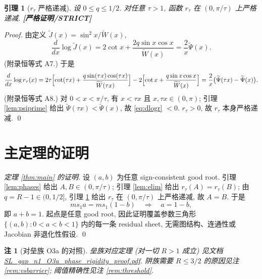 \documentclass[UTF8]{ctexart}
\newtheorem{lemma}[theorem]{引理}
\newtheorem{remark}[theorem]{注}
\newcommand{\STRICT}{\textbf{[严格证明/STRICT]}}
\begin{document}
\begin{lemma}[$r_{\tau}$ 严格递减]\label{lem:rtau}
	设 $0\le q\le1/2$. 对任意 $\tau>1$, 函数 $r_{\tau}$ 在 $(0,\pi/\tau)$ 上严格递减.
	\STRICT{}
\end{lemma}

\begin{proof}
	由定义 $\widetilde J(x)=\sin^2x/\widetilde W(x)$,
	\begin{equation}
		\frac{d}{dx}\log\widetilde J(x)
		=2\cot x+\frac{2q\sin x\cos x}{\widetilde W(x)}
		=\frac{2}{x}\widetilde\Psi(x).
		\label{eq:dlogJ}
	\end{equation}
	(附录恒等式 A7.) 于是
	\begin{equation}
		\frac{d}{dx}\log r_{\tau}(x)
		=2\tau\Bigl[\cot(\tau x)+\frac{q\sin(\tau x)\cos(\tau x)}
			{\widetilde W(\tau x)}\Bigr]
		-2\Bigl[\cot x+\frac{q\sin x\cos x}{\widetilde W(x)}\Bigr]
		=\frac{2}{x}\bigl(\widetilde\Psi(\tau x)-\widetilde\Psi(x)\bigr).
		\label{eq:dlogr}
	\end{equation}
	(附录恒等式 A8.) 对 $0<x<\pi/\tau$, 有 $x<\tau x$ 且 $x,\tau x\in(0,\pi)$;
	引理 \ref{lem:psiprime} 给出 $\widetilde\Psi(\tau x)<\widetilde\Psi(x)$,
	故 \eqref{eq:dlogr} $<0$. $r_{\tau}>0$, 故 $r_{\tau}$ 本身严格递减. \qed
\end{proof}

\section{主定理的证明}\label{sec:proof}

\begin{proof}[定理 \ref{thm:main} 的证明]
	设 $(a,b)$ 为任意 sign-consistent good root. 引理 \ref{lem:phases} 给出
	$A,B\in(0,\pi/\tau)$; 引理 \ref{lem:elim} 给出 $r_{\tau}(A)=r_{\tau}(B)$;
	由 $q=R-1\in(0,1/2]$, 引理 \ref{lem:rtau} 给出 $r_{\tau}$ 在 $(0,\pi/\tau)$
	上严格递减, 故 $A=B$. 于是
	\begin{equation}
		ms_1a=ms_1(1-b)\quad\Longrightarrow\quad a=1-b,
	\end{equation}
	即 $a+b=1$. 起点是任意 good root, 因此证明覆盖参数三角形
	$\{(a,b):0<a<b<1\}$ 内的每一条 residual sheet, 无需图结构、连通性或
	Jacobian 非退化性假设. \qed
\end{proof}

\begin{remark}[对垒族 O3a 的对照]
	垒族对应定理 (对一切 $R>1$ 成立) 见文档
	\url{SL_gap_n1_O3a_phase_rigidity_proof.pdf}.
	阱族需要 $R\le3/2$ 的原因见注 \ref{rem:vsbarrier}; 阈值精确性见注 \ref{rem:threshold}.
\end{remark}
\end{document}

